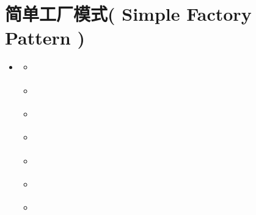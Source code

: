 \documentclass[letterpaper,10pt,english]{sphinxmanual}
\begin{document}
\section{简单工厂模式( Simple Factory Pattern )}
\label{\detokenize{creational_patterns/simple_factory:simple-factory-pattern}}\label{\detokenize{creational_patterns/simple_factory:simple-factory}}\label{\detokenize{creational_patterns/simple_factory::doc}}
\begin{sphinxShadowBox}
\begin{itemize}
\item {} 
\sphinxAtStartPar
{}\label{\detokenize{creational_patterns/simple_factory:id14}}{\hyperref[\detokenize{creational_patterns/simple_factory:simple-factory-pattern}]{}}
\begin{itemize}
\item {} 
\sphinxAtStartPar
{}\label{\detokenize{creational_patterns/simple_factory:id15}}{\hyperref[\detokenize{creational_patterns/simple_factory:id2}]{}}

\item {} 
\sphinxAtStartPar
{}\label{\detokenize{creational_patterns/simple_factory:id16}}{\hyperref[\detokenize{creational_patterns/simple_factory:id3}]{}}

\item {} 
\sphinxAtStartPar
{}\label{\detokenize{creational_patterns/simple_factory:id17}}{\hyperref[\detokenize{creational_patterns/simple_factory:id4}]{}}

\item {} 
\sphinxAtStartPar
{}\label{\detokenize{creational_patterns/simple_factory:id18}}{\hyperref[\detokenize{creational_patterns/simple_factory:id5}]{}}

\item {} 
\sphinxAtStartPar
{}\label{\detokenize{creational_patterns/simple_factory:id19}}{\hyperref[\detokenize{creational_patterns/simple_factory:id6}]{}}

\item {} 
\sphinxAtStartPar
{}\label{\detokenize{creational_patterns/simple_factory:id20}}{\hyperref[\detokenize{creational_patterns/simple_factory:id7}]{}}

\item {} 
\sphinxAtStartPar
{}\label{\detokenize{creational_patterns/simple_factory:id21}}{\hyperref[\detokenize{creational_patterns/simple_factory:id8}]{}}


\end{itemize}
\end{itemize}
\end{sphinxShadowBox}
\end{document}
